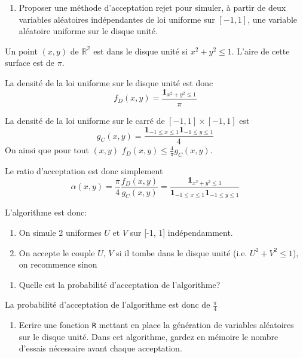 \documentclass[
]{article}
\providecommand{\tightlist}{%
  \setlength{\itemsep}{0pt}\setlength{\parskip}{0pt}}
\newenvironment{Correction}%
  { \vspace{\baselineskip}\begin{mdframed}[backgroundcolor=my_green]}%
  {\end{mdframed}}
\begin{document}
\begin{enumerate}
\def\labelenumi{\arabic{enumi}.}
\setcounter{enumi}{1}
\tightlist
\item
  Proposer une méthode d'acceptation rejet pour simuler, à partir de
  deux variables aléatoires indépendantes de loi uniforme sur
  \([-1, 1]\), une variable aléatoire uniforme sur le disque unité.
\end{enumerate}

\begin{Correction}
Un point $(x, y)$ de $\mathbb{R^2}$ est dans le disque unité si $x^2 + y^2 \leq 1$.
L'aire de cette surface est de $\pi$.

La densité de la loi uniforme sur le disque unité est donc
$$f_D(x, y) = \frac{\mathbf{1}_{x^2 + y^2 \leq 1}}{\pi}$$

La densité de la loi uniforme sur le carré de $[-1, 1] \times [-1, 1]$ est
$$g_C(x, y) = \frac{\mathbf{1}_{-1\leq x \leq 1} \mathbf{1}_{-1 \leq y\leq 1}}{4}$$
On ainsi que pour tout $(x, y)$ $f_D(x, y) \leq \frac{4}{\pi} g_C(x, y)$.

Le ratio d'acceptation est donc simplement
$$\alpha(x, y) = \frac{\pi}{4}\frac{f_D(x, y)}{g_C(x, y)} = \frac{\mathbf{1}_{x^2 + y^2 \leq 1}}{\mathbf{1}_{-1\leq x \leq 1} \mathbf{1}_{-1 \leq y\leq 1}}$$

L'algorithme est donc:

\begin{enumerate}
\item On simule 2 uniformes $U$ et $V$ sur [-1, 1] indépendamment.
\item On accepte le couple $U$, $V$ si il tombe dans le disque unité (i.e. $U^2 + V^2 \leq 1$), on recommence sinon
\end{enumerate}

\end{Correction}

\begin{enumerate}
\def\labelenumi{\arabic{enumi}.}
\setcounter{enumi}{2}
\tightlist
\item
  Quelle est la probabilité d'acceptation de l'algorithme?
\end{enumerate}

\begin{Correction}
La probabilité d'acceptation de l'algorithme est donc de $\frac{\pi}{4}$
\end{Correction}

\begin{enumerate}
\def\labelenumi{\arabic{enumi}.}
\setcounter{enumi}{3}
\tightlist
\item
  Ecrire une fonction \texttt{R} mettant en place la génération de
  variables aléatoires sur le disque unité. Dans cet algorithme, gardez
  en mémoire le nombre d'essais nécessaire avant chaque acceptation.
\end{enumerate}
\end{document}
